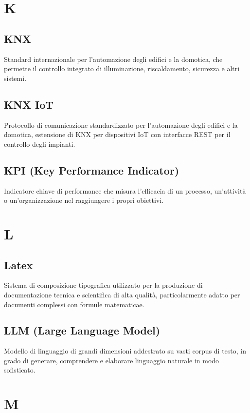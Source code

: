 \documentclass[a4paper,11pt]{article}
\begin{document}
\newpage
\section{K}

\subsection{KNX}
Standard internazionale per l'automazione degli edifici e la domotica, che permette il controllo integrato di illuminazione, riscaldamento, sicurezza e altri sistemi.

\subsection{KNX IoT}
Protocollo di comunicazione standardizzato per l'automazione degli edifici e la domotica, estensione di KNX per dispositivi IoT con interfacce REST per il controllo degli impianti.

\subsection{KPI (Key Performance Indicator)}
Indicatore chiave di performance che misura l'efficacia di un processo, un'attività o un'organizzazione nel raggiungere i propri obiettivi.

\newpage
\section{L}

\subsection{Latex}
Sistema di composizione tipografica utilizzato per la produzione di documentazione tecnica e scientifica di alta qualità, particolarmente adatto per documenti complessi con formule matematicae.

\subsection{LLM (Large Language Model)}
Modello di linguaggio di grandi dimensioni addestrato su vasti corpus di testo, in grado di generare, comprendere e elaborare linguaggio naturale in modo sofisticato.

\newpage
\section{M}
\end{document}
